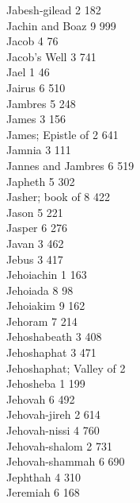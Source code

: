 Jabesh-gilead \hfill 2 \quad \phantom{0}182\\
Jachin and Boaz \hfill 9 \quad \phantom{0}999\\
Jacob \hfill 4 \quad \phantom{0}\phantom{0}76\\
Jacob’s Well \hfill 3 \quad \phantom{0}741\\
Jael \hfill 1 \quad \phantom{0}\phantom{0}46\\
Jairus \hfill 6 \quad \phantom{0}510\\
Jambres \hfill 5 \quad \phantom{0}248\\
James \hfill 3 \quad \phantom{0}156\\
James; Epistle of \hfill 2 \quad \phantom{0}641\\
Jamnia \hfill 3 \quad \phantom{0}111\\
Jannes and Jambres \hfill 6 \quad \phantom{0}519\\
Japheth \hfill 5 \quad \phantom{0}302\\
Jasher; book of \hfill 8 \quad \phantom{0}422\\
Jason \hfill 5 \quad \phantom{0}221\\
Jasper \hfill 6 \quad \phantom{0}276\\
Javan \hfill 3 \quad \phantom{0}462\\
Jebus \hfill 3 \quad \phantom{0}417\\
Jehoiachin \hfill 1 \quad \phantom{0}163\\
Jehoiada \hfill 8 \quad \phantom{0}\phantom{0}98\\
Jehoiakim \hfill 9 \quad \phantom{0}162\\
Jehoram \hfill 7 \quad \phantom{0}214\\
Jehoshabeath \hfill 3 \quad \phantom{0}408\\
Jehoshaphat \hfill 3 \quad \phantom{0}471\\
Jehoshaphat; Valley of \hfill 2 \\
Jehosheba \hfill 1 \quad \phantom{0}199\\
Jehovah \hfill 6 \quad \phantom{0}492\\
Jehovah-jireh \hfill 2 \quad \phantom{0}614\\
Jehovah-nissi \hfill 4 \quad \phantom{0}760\\
Jehovah-shalom \hfill 2 \quad \phantom{0}731\\
Jehovah-shammah \hfill 6 \quad \phantom{0}690\\
Jephthah \hfill 4 \quad \phantom{0}310\\
Jeremiah \hfill 6 \quad \phantom{0}168\\
